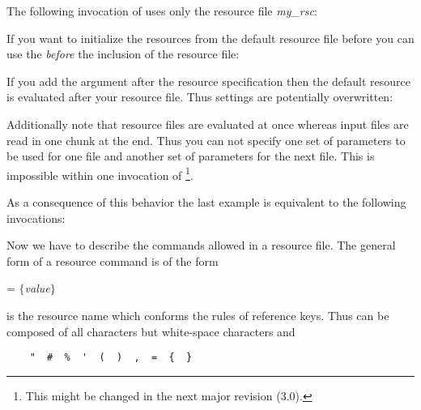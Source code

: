 \documentclass[11pt,a4paper]{scrbook}
\begin{document}
The following invocation of \BibTool{} uses only the resource file
\textit{my\_rsc}: 


If you want to initialize the resources from the default resource file before
you can use the  \emph{before} the inclusion of the resource file:


If you add the  argument after the resource specification then the
default resource is evaluated after your resource file. Thus settings are
potentially overwritten:


Additionally note that resource files are evaluated at once whereas input
files are read in one chunk at the end. Thus you can not specify one set of
parameters to be used for one file and another set of parameters for the next
file. This is impossible within one invocation of \BibTool\footnote{This might
  be changed in the next major revision (3.0).}.

As a consequence of this behavior the last example is equivalent to the
following invocations:

\vspace*{-4ex}
\medskip

Now we have to describe the commands allowed in a resource file.  The general
form of a resource command is of the form

\begin{Resources}
   = $\{$\textit{value}$\}$
\end{Resources}

 is the resource name which conforms the rules of \BibTeX{}
reference keys. Thus  can be composed of all characters but
white-space characters and\index{\#}\index{\%}\index{=}\index{,}%
\index{(}\index{)}
\begin{verbatim}
    "  #  %  '  (  )  ,  =  {  }
\end{verbatim}
\end{document}
